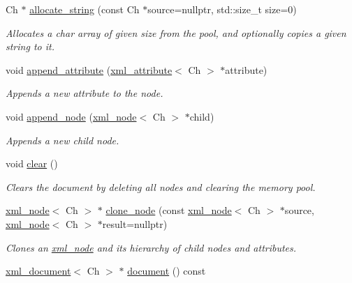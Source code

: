 \begin{DoxyCompactItemize}
Ch $\ast$ \mbox{\hyperlink{classrapidxml_1_1memory__pool_a74228316f70642f61d6a3a9b7f9ab826}{allocate\+\_\+string}} (const Ch $\ast$source=nullptr, std\+::size\+\_\+t size=0)
\begin{DoxyCompactList}\small\item\em Allocates a char array of given size from the pool, and optionally copies a given string to it. \end{DoxyCompactList}\item 
void \mbox{\hyperlink{classrapidxml_1_1xml__node_a8fbd4f5ef7169d493da9f8d87ac04b77}{append\+\_\+attribute}} (\mbox{\hyperlink{classrapidxml_1_1xml__attribute}{xml\+\_\+attribute}}$<$ Ch $>$ $\ast$attribute)
\begin{DoxyCompactList}\small\item\em Appends a new attribute to the node. \end{DoxyCompactList}\item 
void \mbox{\hyperlink{classrapidxml_1_1xml__node_a86de2e22276826089b7baed2599f8dee}{append\+\_\+node}} (\mbox{\hyperlink{classrapidxml_1_1xml__node}{xml\+\_\+node}}$<$ Ch $>$ $\ast$child)
\begin{DoxyCompactList}\small\item\em Appends a new child node. \end{DoxyCompactList}\item 
void \mbox{\hyperlink{classrapidxml_1_1xml__document_ac8bb3912a3ce86b15842e79d0b421204}{clear}} ()
\begin{DoxyCompactList}\small\item\em Clears the document by deleting all nodes and clearing the memory pool. \end{DoxyCompactList}\item 
\mbox{\hyperlink{classrapidxml_1_1xml__node}{xml\+\_\+node}}$<$ Ch $>$ $\ast$ \mbox{\hyperlink{classrapidxml_1_1memory__pool_ae8bc45920cb126b6a4bb29f667800ea2}{clone\+\_\+node}} (const \mbox{\hyperlink{classrapidxml_1_1xml__node}{xml\+\_\+node}}$<$ Ch $>$ $\ast$source, \mbox{\hyperlink{classrapidxml_1_1xml__node}{xml\+\_\+node}}$<$ Ch $>$ $\ast$result=nullptr)
\begin{DoxyCompactList}\small\item\em Clones an \mbox{\hyperlink{classrapidxml_1_1xml__node}{xml\+\_\+node}} and its hierarchy of child nodes and attributes. \end{DoxyCompactList}\item 
\mbox{\hyperlink{classrapidxml_1_1xml__document}{xml\+\_\+document}}$<$ Ch $>$ $\ast$ \mbox{\hyperlink{classrapidxml_1_1xml__node_ae5396d92d09394b37838f2518f430da4}{document}} () const

\end{DoxyCompactItemize}
